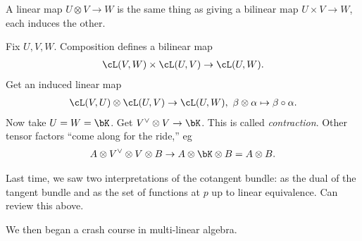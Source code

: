\begin{lem}\label{lem:universal-property-tensor-products}
	A linear map $U\otimes V \to W$ is the same thing as giving a bilinear map $U\times V \to W$, each induces the other.
\end{lem}
\begin{example}\label{example:lec2.35}
	Fix $U,V,W$. Composition defines a bilinear map
	\begin{align*}
		\cL(V,W) \times \cL(U,V) \to \cL(U,W).
	\end{align*}
	Get an induced linear map
	\begin{align*}
		\cL(V,U) \otimes \cL(U,V) \to \cL(U,W), ~ \beta\otimes \alpha \mapsto \beta \circ \alpha.
	\end{align*}
	Now take $U = W = \bK$. Get $V^\vee \otimes V \to \bK$. This is called \emph{contraction}. Other tensor factors ``come along for the ride,'' eg
	\begin{align*}
		A\otimes V^\vee \otimes V\otimes B \to A\otimes \bK \otimes B = A\otimes B.
	\end{align*}
\end{example}

Last time, we saw two interpretations of the cotangent bundle: as the dual of the tangent bundle and as the set of functions at $p$ up to linear equivalence. Can review this above.

We then began a crash course in multi-linear algebra.


